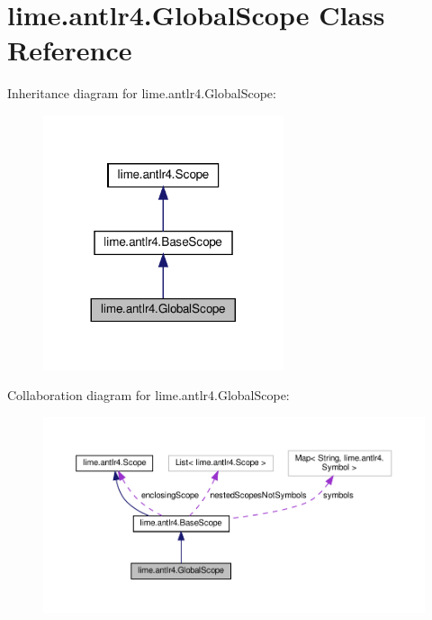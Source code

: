\hypertarget{classlime_1_1antlr4_1_1GlobalScope}{}\section{lime.\+antlr4.\+Global\+Scope Class Reference}
\label{classlime_1_1antlr4_1_1GlobalScope}


Inheritance diagram for lime.\+antlr4.\+Global\+Scope\+:
\nopagebreak
\begin{figure}[H]
\begin{center}
\leavevmode
\includegraphics[width=200pt]{classlime_1_1antlr4_1_1GlobalScope__inherit__graph}
\end{center}
\end{figure}


Collaboration diagram for lime.\+antlr4.\+Global\+Scope\+:
\nopagebreak
\begin{figure}[H]
\begin{center}
\leavevmode
\includegraphics[width=350pt]{classlime_1_1antlr4_1_1GlobalScope__coll__graph}
\end{center}
\end{figure}
